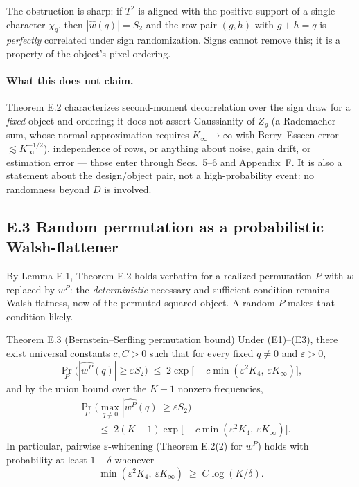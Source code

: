 The obstruction is sharp: if $T^2$ is aligned with the positive support of a single character $\chi_q$, then $|\hat w(q)|=S_2$ and the row pair $(g,h)$ with $g+h=q$ is \emph{perfectly} correlated under sign randomization. Signs cannot remove this; it is a property of the object's pixel ordering.

\paragraph{What this does not claim.} Theorem E.2 characterizes second-moment decorrelation over the sign draw for a \emph{fixed} object and ordering; it does not assert Gaussianity of $Z_g$ (a Rademacher sum, whose normal approximation requires $K_\infty\to\infty$ with Berry--Esseen error $\lesssim K_\infty^{-1/2}$), independence of rows, or anything about noise, gain drift, or estimation error --- those enter through Secs.~5--6 and Appendix~F. It is also a statement about the design/object pair, not a high-probability event: no randomness beyond $D$ is involved.

\subsection{E.3 Random permutation as a probabilistic Walsh-flattener}

By Lemma E.1, Theorem E.2 holds verbatim for a realized permutation $P$ with $w$ replaced by $w^P$: the \emph{deterministic} necessary-and-sufficient condition remains Walsh-flatness, now of the permuted squared object. A random $P$ makes that condition likely.

\begin{namedthm}{Theorem E.3 (Bernstein--Serfling permutation bound)}
Under (E1)--(E3), there exist universal constants $c,C>0$ such that for every fixed $q\neq0$ and $\varepsilon>0$,
\begin{equation}
\Pr_P\!\big(|\widehat{w^P}(q)|\ge\varepsilon S_2\big)\;\le\;2\exp\!\big[-c\min(\varepsilon^2K_4,\ \varepsilon K_\infty)\big], \tag{E.2}
\end{equation}
and by the union bound over the $K-1$ nonzero frequencies,
\begin{equation}
\begin{aligned}
&\Pr_P\!\big(\max_{q\neq0}|\widehat{w^P}(q)|\ge\varepsilon S_2\big)\\
&\qquad\le\;2(K-1)\exp\!\big[-c\min(\varepsilon^2K_4,\ \varepsilon K_\infty)\big].
\end{aligned}
\tag{E.3}
\end{equation}
In particular, pairwise $\varepsilon$-whitening (Theorem E.2(2) for $w^P$) holds with probability at least $1-\delta$ whenever
\begin{equation}
\min(\varepsilon^2K_4,\ \varepsilon K_\infty)\;\ge\;C\log(K/\delta). \tag{E.4}
\end{equation}
\end{namedthm}

